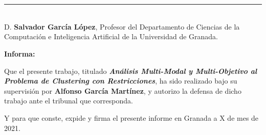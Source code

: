 







\chapter*{}
\thispagestyle{empty}

\noindent\rule[-1ex]{\textwidth}{2pt}\\[4.5ex]

D. \textbf{Salvador García López}, Profesor del Departamento de Ciencias de la Computación e Inteligencia Artificial de la Universidad de Granada.

\vspace{0.5cm}

\textbf{Informa:}

\vspace{0.5cm}

Que el presente trabajo, titulado \textit{\textbf{Análisis Multi-Modal y Multi-Objetivo al Problema de Clustering con Restricciones}}, ha sido realizado bajo su supervisión por \textbf{Alfonso García Martínez}, y autorizo la defensa de dicho trabajo ante el tribunal que corresponda.

\vspace{0.5cm}

Y para que conste, expide y firma el presente informe en Granada a X de mes de 2021.

